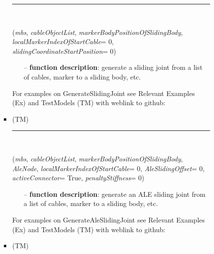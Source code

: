 \begin{itemize}[leftmargin=1.4cm]
\begin{itemize}[leftmargin=1.4cm]
\begin{itemize}[leftmargin=0.5cm]
\begin{itemize}[leftmargin=1.4cm]
%
\noindent\rule{8cm}{0.75pt}\vspace{1pt} \\ 
\begin{flushleft}
\label{sec:beams:GenerateSlidingJoint}
({\it mbs}, {\it cableObjectList}, {\it markerBodyPositionOfSlidingBody}, {\it localMarkerIndexOfStartCable}= 0, {\it slidingCoordinateStartPosition}= 0)
\end{flushleft}
\setlength{\itemindent}{0.7cm}
\begin{itemize}[leftmargin=0.7cm]
\item[--]
{\bf function description}: generate a sliding joint from a list of cables, marker to a sliding body, etc.
\vspace{12pt}\end{itemize}
%
%
\noindent For examples on GenerateSlidingJoint see Relevant Examples (Ex) and TestModels (TM) with weblink to github:
\bi
 \item \footnotesize {} (TM)
\ei

%
\noindent\rule{8cm}{0.75pt}\vspace{1pt} \\ 
\begin{flushleft}
\label{sec:beams:GenerateAleSlidingJoint}
({\it mbs}, {\it cableObjectList}, {\it markerBodyPositionOfSlidingBody}, {\it AleNode}, {\it localMarkerIndexOfStartCable}= 0, {\it AleSlidingOffset}= 0, {\it activeConnector}= True, {\it penaltyStiffness}= 0)
\end{flushleft}
\setlength{\itemindent}{0.7cm}
\begin{itemize}[leftmargin=0.7cm]
\item[--]
{\bf function description}: generate an ALE sliding joint from a list of cables, marker to a sliding body, etc.
\vspace{12pt}\end{itemize}
%
%
\noindent For examples on GenerateAleSlidingJoint see Relevant Examples (Ex) and TestModels (TM) with weblink to github:
\bi
 \item \footnotesize {} (TM)
\ei


\end{itemize}
\end{itemize}
\end{itemize}
\end{itemize}
